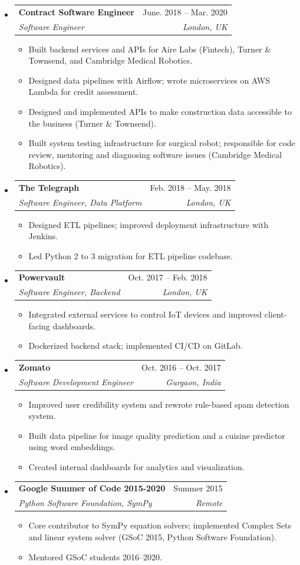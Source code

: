 \documentclass[letterpaper,12pt]{article}[leftmargin=*]
\makeatletter
\def \entryspacing {-0pt}
\newcommand{\resumeEntryStart}{\begin{itemize}[leftmargin=2.5mm]}
\newcommand{\resumeEntryEnd}{\end{itemize}\vspace{\entryspacing}}
\newcommand{\resumeItemListStart}{\begin{itemize}[leftmargin=4.5mm]}
\newcommand{\resumeItemListEnd}{\end{itemize}}
\newcommand{\resumeItem}[1]{
  \item{\small #1\par}\vspace{-2pt}
}
\newcommand{\resumeEntryTSDL}[4]{
  \vspace{-1pt}\item[]
    \begin{tabularx}{0.97\textwidth}{X@{\hspace{60pt}}r}
      \textbf{\color{primary}#1} & {\firabook\color{accent}\small#2} \\
      \textit{\color{accent}\small#3} & \textit{\color{accent}\small#4} \\
    \end{tabularx}\vspace{-6pt}
}
\makeatother
\begin{document}
  \resumeEntryStart
    \resumeEntryTSDL
      {Contract Software Engineer}{June. 2018 -- Mar. 2020}
      {Software Engineer}{London, UK}
    \resumeItemListStart
      \resumeItem{Built backend services and APIs for Aire Labs (Fintech), Turner \& Townsend, and Cambridge Medical Robotics.}
      \resumeItem{Designed data pipelines with Airflow; wrote microservices on AWS Lambda for credit assessment.}
      \resumeItem{Designed and implemented APIs to make construction data accessible to the business (Turner \& Townsend).}
      \resumeItem{Built system testing infrastructure for surgical robot; responsible for code review, mentoring and diagnosing software issues (Cambridge Medical Robotics).}
    \resumeItemListEnd
  \resumeEntryEnd


  \resumeEntryStart
    \resumeEntryTSDL
      {The Telegraph}{Feb. 2018 -- May. 2018}
      {Software Engineer, Data Platform}{London, UK}
    \resumeItemListStart
      \resumeItem{Designed ETL pipelines; improved deployment infrastructure with Jenkins.}
      \resumeItem{Led Python 2 to 3 migration for ETL pipeline codebase.}
    \resumeItemListEnd
  \resumeEntryEnd

  \resumeEntryStart
    \resumeEntryTSDL
      {Powervault}{Oct. 2017 -- Feb. 2018}
      {Software Engineer, Backend}{London, UK}
    \resumeItemListStart
      \resumeItem{Integrated external services to control IoT devices and improved client-facing dashboards.}
      \resumeItem{Dockerized backend stack; implemented CI/CD on GitLab.}
    \resumeItemListEnd
  \resumeEntryEnd

  \resumeEntryStart
    \resumeEntryTSDL
      {Zomato}{Oct. 2016 -- Oct. 2017}
      {Software Development Engineer}{Gurgaon, India}
    \resumeItemListStart
      \resumeItem{Improved user credibility system and rewrote rule-based spam detection system.}
      \resumeItem{Built data pipeline for image quality prediction and a cuisine predictor using word embeddings.}
      \resumeItem{Created internal dashboards for analytics and visualization.}
    \resumeItemListEnd
  \resumeEntryEnd

  \resumeEntryStart
    \resumeEntryTSDL
      {Google Summer of Code 2015-2020}{Summer 2015}
      {Python Software Foundation, SymPy}{Remote}
    \resumeItemListStart
      \resumeItem{Core contributor to SymPy equation solvers; implemented Complex Sets and linear system solver (GSoC 2015, Python Software Foundation).}
      \resumeItem{Mentored GSoC students 2016--2020.}
    \resumeItemListEnd
  \resumeEntryEnd
\end{document}
